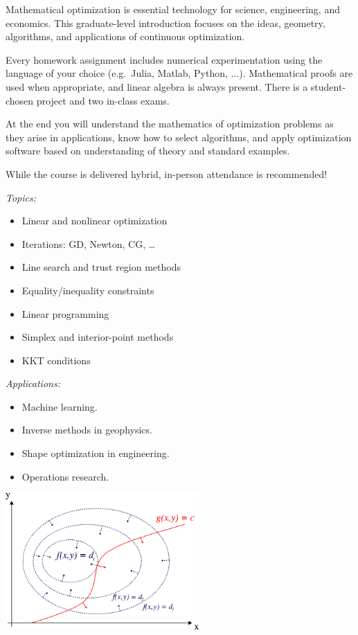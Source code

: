 \documentclass[12pt]{amsart}
\begin{document}
Mathematical optimization is essential technology for science, engineering, and economics.  This graduate-level introduction focuses on the ideas, geometry, algorithms, and applications of continuous optimization.

\smallskip
Every homework assignment includes numerical experimentation using the language of your choice (e.g.~Julia, Matlab, Python, ...).  Mathematical proofs are used when appropriate, and linear algebra is always present.  There is a student-chosen project and two in-class exams.

\smallskip
At the end you will understand the mathematics of optimization problems as they arise in applications, know how to select algorithms, and apply optimization software based on understanding of theory and standard examples.

\smallskip
While the course is delivered hybrid, in-person attendance is recommended!

\bigskip \noindent 
\begin{minipage}[t]{0.55\textwidth} \emph{Topics:}
\begin{itemize}
\item Linear and nonlinear optimization
\item Iterations: GD, Newton, CG, \dots
\item Line search and trust region methods
\item Equality/inequality constraints
\item Linear programming
\item Simplex and interior-point methods
\item KKT conditions
\end{itemize}

\bigskip
\emph{Applications:}
\begin{itemize}
\item Machine learning.
\item Inverse methods in geophysics.
\item Shape optimization in engineering.
\item Operations research.
\end{itemize}
\end{minipage}
\begin{minipage}[t]{0.45\textwidth}
\smallskip

\centering
\includegraphics[height=52mm]{../../images/lagrange.png}
\end{minipage}
\end{document}
